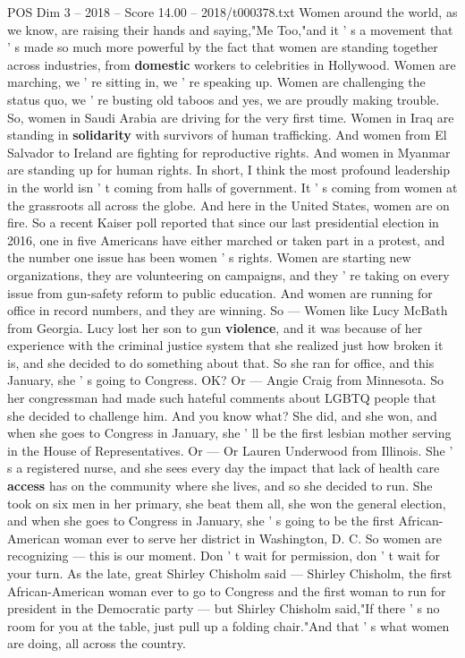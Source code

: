 \begin{textsample}{POS Dim 3 – 2018 – Score 14.00 – 2018/t000378.txt}
Women around the world, as we know, are raising their hands and saying,"Me Too,"and it ' s a movement that ' s made so much more powerful by the fact that women are standing together across industries, from \textbf{domestic} workers to celebrities in Hollywood.
Women are marching, we ' re sitting in, we ' re speaking up.
Women are challenging the status quo, we ' re busting old taboos and yes, we are proudly making trouble.
So, women in Saudi Arabia are driving for the very first time.
Women in Iraq are standing in \textbf{solidarity} with survivors of human trafficking.
And women from El Salvador to Ireland are fighting for reproductive rights.
And women in Myanmar are standing up for human rights.
In short, I think the most profound leadership in the world isn ' t coming from halls of government.
It ' s coming from women at the grassroots all across the globe.
And here in the United States, women are on fire.
So a recent Kaiser poll reported that since our last presidential election in 2016, one in five Americans have either marched or taken part in a protest, and the number one issue has been women ' s rights.
Women are starting new organizations, they are volunteering on campaigns, and they ' re taking on every issue from gun-safety reform to public education.
And women are running for office in record numbers, and they are winning.
So — Women like Lucy McBath from Georgia.
Lucy lost her son to gun \textbf{violence}, and it was because of her experience with the criminal justice system that she realized just how broken it is, and she decided to do something about that.
So she ran for office, and this January, she ' s going to Congress.
OK?
Or — Angie Craig from Minnesota.
So her congressman had made such hateful comments about LGBTQ people that she decided to challenge him.
And you know what?
She did, and she won, and when she goes to Congress in January, she ' ll be the first lesbian mother serving in the House of Representatives.
Or — Or Lauren Underwood from Illinois.
She ' s a registered nurse, and she sees every day the impact that lack of health care \textbf{access} has on the community where she lives, and so she decided to run.
She took on six men in her primary, she beat them all, she won the general election, and when she goes to Congress in January, she ' s going to be the first African-American woman ever to serve her district in Washington, D.
C.
So women are recognizing — this is our moment.
Don ' t wait for permission, don ' t wait for your turn.
As the late, great Shirley Chisholm said — Shirley Chisholm, the first African-American woman ever to go to Congress and the first woman to run for president in the Democratic party — but Shirley Chisholm said,"If there ' s no room for you at the table, just pull up a folding chair."And that ' s what women are doing, all across the country.

\end{textsample}
